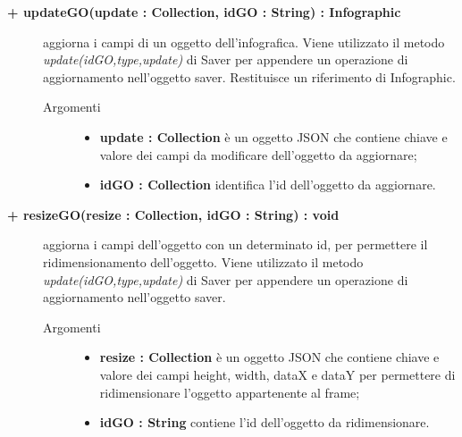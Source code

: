 \begin{description}
\begin{description}
\begin{description}
\end{description}

\end{description}

\begin{description}
		\item[\textbf{\color{blue}+ updateGO(update : Collection, idGO : String) : Infographic			}] \hfill
			aggiorna i campi di un oggetto dell'infografica. Viene utilizzato il metodo \textit{update(idGO,type,update)} di Saver per appendere un operazione di aggiornamento nell'oggetto saver. Restituisce un riferimento di Infographic.   

\begin{description}
			\item[Argomenti] \hfill
				\begin{itemize}
						\item \textbf{update : Collection			} \hfill
					è un oggetto JSON che contiene chiave e valore dei campi da modificare dell'oggetto da aggiornare;
					\item \textbf{idGO : Collection			} \hfill
					identifica l'id dell'oggetto da aggiornare.
				\end{itemize}

\end{description}

\end{description}

\begin{description}
		\item[\textbf{\color{blue}+ resizeGO(resize : Collection, idGO : String) : void			}] \hfill
			aggiorna i campi dell'oggetto con un determinato id, per permettere il ridimensionamento dell'oggetto. Viene utilizzato il metodo \textit{update(idGO,type,update)} di Saver per appendere un operazione di aggiornamento nell'oggetto saver.     

\begin{description}
			\item[Argomenti] \hfill
				\begin{itemize}
					\item \textbf{resize : Collection			} \hfill
					è un oggetto JSON che contiene chiave e valore dei campi height, width, dataX e dataY per permettere di ridimensionare l'oggetto appartenente al frame;
					\item \textbf{idGO : String			} \hfill
					contiene l'id dell'oggetto da ridimensionare.
				\end{itemize}


\end{description}
\end{description}
\end{description}
